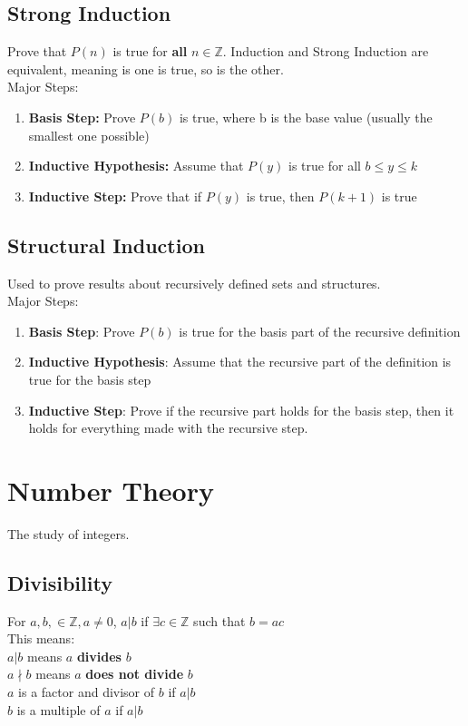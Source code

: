 \documentclass[letter]{article}
\begin{document}
\begin{multicols}{2}
  \subsection{Strong Induction}
  Prove that $P(n)$ is true for \textbf{all} $n \in \mathbb{Z}$. Induction and
  Strong Induction are equivalent, meaning is one is true, so is the other. \\
  Major Steps:
  \begin{enumerate}
    \item \textbf{Basis Step:} Prove $P(b)$ is true, where b is the base value
          (usually the smallest one possible)
    \item \textbf{Inductive Hypothesis:} Assume that $P(y)$ is true for all
          $b \leq y \leq k$
    \item \textbf{Inductive Step:} Prove that if $P(y)$ is true, then $P(k + 1)$
          is true
  \end{enumerate}

  \subsection{Structural Induction}
  Used to prove results about recursively defined sets and structures. \\
  Major Steps:
  \begin{enumerate}
    \item \textbf{Basis Step}: Prove $P(b)$ is true for the basis part of the
          recursive definition
    \item \textbf{Inductive Hypothesis}: Assume that the recursive part of the
          definition is true for the basis step
    \item \textbf{Inductive Step}: Prove if the recursive part holds for the
          basis step, then it holds for everything made with the recursive step.
  \end{enumerate}

  \section{Number Theory}
  The study of integers.
  \subsection{Divisibility}
  For $a, b, \in \mathbb{Z}, a \neq 0$, $a|b$ if $\exists c \in \mathbb{Z}$ such 
  that $b = ac$\\
  This means:\\
  $a|b$ means $a$ \textbf{divides} $b$\\
  $a \nmid b$ means $a$ \textbf{does not divide} $b$\\
  $a$ is a factor and divisor of $b$ if $a|b$\\
  $b$ is a multiple of $a$ if $a|b$


\end{multicols}
\end{document}
